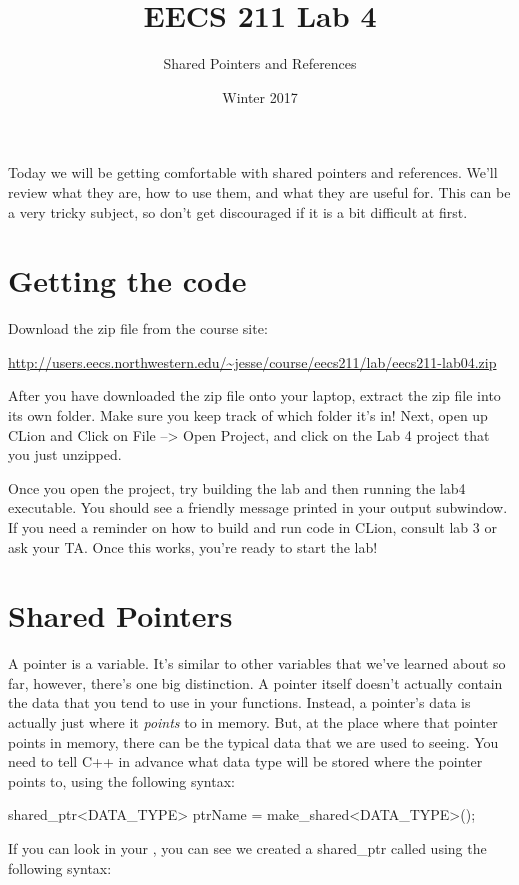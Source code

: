 \documentclass{tufte-handout}
\title{EECS 211 Lab 4}
\author{Shared Pointers and References}
\date{Winter 2017}
\begin{document}
\maketitle

Today we will be getting comfortable with shared pointers and references. We'll review what they are, how to use them, and what they are useful for.  This can be a very tricky subject, so don't get discouraged if it is a bit difficult at first.

\section{Getting the code}
Download the zip file from the course site: \medskip

\url{http://users.eecs.northwestern.edu/~jesse/course/eecs211/lab/eecs211-lab04.zip}

\medskip \noindent
After you have downloaded the zip file onto your laptop, extract the zip file into its own folder. Make sure you keep track of which folder it's in!  Next, open up CLion and Click on File --> Open Project, and click on the Lab 4 project that you just unzipped. 

Once you open the project, try building the lab and then running the lab4 executable. 
You should see a friendly message printed in your output subwindow.
If you need a reminder on how to build and run code in CLion, consult lab 3 or ask your TA.
Once this works, you're ready to start the lab!


\section{Shared Pointers}
A pointer is a variable. 
It's similar to other variables that we've learned about so far, however, there's one big distinction. 
A pointer itself doesn't actually contain the data that you tend to use in your functions.  
Instead, a pointer's data is actually just where it \textit{points} to in memory.
But, at the place where that pointer points in memory, there can be the typical data that we are used to seeing.  
You need to tell C++ in advance what data type will be stored where the pointer points to, using the following syntax:

\begin{Code}
shared_ptr<DATA_TYPE> ptrName = make_shared<DATA_TYPE>();
\end{Code}

\noindent
If you can look in your , you can see we created a shared\_ptr  called  using the following syntax:
\end{document}
